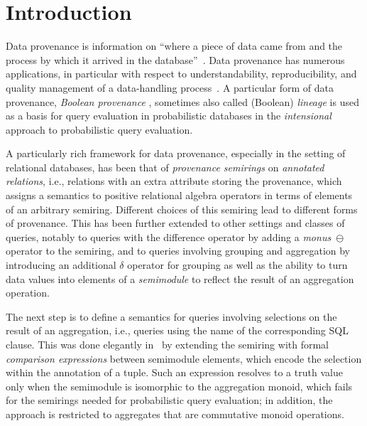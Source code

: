 \section{Introduction}
Data provenance is information on ``where a piece of data came from and
the process by which it arrived in the database''~\cite{bunemankt01}. Data
provenance has numerous applications, in particular with respect to
understandability, reproducibility, and quality management of a
data-handling process~\cite{herschel2017survey}. A particular form of
data provenance, \emph{Boolean provenance}
\cite{senellart2017provenance}, sometimes also called (Boolean) \emph{lineage}
\cite{suciu2011probabilistic} is used as a basis for query
evaluation in probabilistic databases in the \emph{intensional}
\cite{jha2010bridging} approach to probabilistic query evaluation.

A particularly rich framework for data provenance, especially in the
setting of relational databases, has been that of \emph{provenance
semirings} \cite{green2007provenance} on \emph{annotated relations},
i.e., relations with an extra attribute storing the provenance, which
assigns a semantics to
positive relational algebra operators in terms of elements of an arbitrary
semiring. Different choices of this semiring lead to different forms of
provenance. This has been further extended to other settings and
classes of queries,
notably to queries with the difference operator \cite{geerts2010database}
by adding a \emph{monus}~$\ominus$ operator to the semiring, and to queries
involving grouping and aggregation \cite{amsterdamer2011provenance} by
introducing an additional $\delta$ operator for grouping as well as
the ability to turn data values into elements of a
\emph{semimodule} to reflect the result of an aggregation operation.

The next step is to define a semantics for queries involving
selections on the result of an aggregation, i.e., 
queries using the name of the corresponding SQL clause. This was done
elegantly in~\cite{amsterdamer2011provenance} by extending the semiring
with formal \emph{comparison expressions} between semimodule elements,
which encode the selection within the annotation of a tuple. Such an
expression resolves to a truth value only when the semimodule is
isomorphic to the aggregation monoid, which fails for the semirings
needed for probabilistic query evaluation; in addition, the approach is
restricted to aggregates that are commutative monoid
operations.


